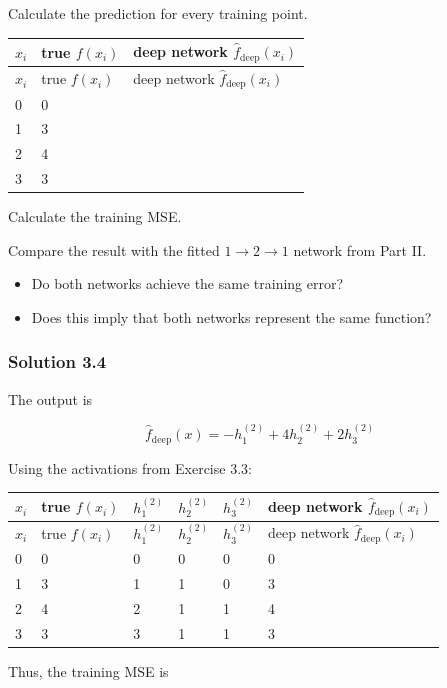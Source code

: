 \documentclass[10pt]{article}
\begin{document}
Calculate the prediction for every training point.

\begingroup
\small
\setlength{\tabcolsep}{4pt}
\begin{longtable}{l|l|l}
$x_i$ & true $f(x_i)$ & deep network $\hat f_{\mathrm{deep}}(x_i)$ \\[1.5pt]
\hline
\endfirsthead
$x_i$ & true $f(x_i)$ & deep network $\hat f_{\mathrm{deep}}(x_i)$ \\[1.5pt]
\hline
\endhead
\rule{0pt}{2.4ex}0 & 0 &  $\phantom{-0.00}$ \\[3pt]
\rule{0pt}{2.4ex}1 & 3 &  $\phantom{-0.00}$ \\[3pt]
\rule{0pt}{2.4ex}2 & 4 &  $\phantom{-0.00}$ \\[3pt]
\rule{0pt}{2.4ex}3 & 3 &  $\phantom{-0.00}$ \\[3pt]
\end{longtable}
\endgroup
Calculate the training MSE.

Compare the result with the fitted $1\rightarrow2\rightarrow1$ network from Part II.

\begin{itemize}
\item
Do both networks achieve the same training error?

\item
Does this imply that both networks represent the same function?

\end{itemize}
\begingroup\color{red}

\subsubsection*{Solution 3.4}
The output is

\[
\hat f_{\mathrm{deep}}(x)=-h^{(2)}_1+4h^{(2)}_2+2h^{(2)}_3
\]

Using the activations from Exercise 3.3:

\begingroup
\small
\setlength{\tabcolsep}{4pt}
\begin{longtable}{l|l|l|l|l|l}
$x_i$ & true $f(x_i)$ & $h^{(2)}_1$ & $h^{(2)}_2$ & $h^{(2)}_3$ & \shortstack[l]{deep network \\ $\hat f_{\mathrm{deep}}(x_i)$} \\[1.5pt]
\hline
\endfirsthead
$x_i$ & true $f(x_i)$ & $h^{(2)}_1$ & $h^{(2)}_2$ & $h^{(2)}_3$ & \shortstack[l]{deep network \\ $\hat f_{\mathrm{deep}}(x_i)$} \\[1.5pt]
\hline
\endhead
0 & 0 & 0 & 0 & 0 & 0 \\[1.5pt]
1 & 3 & 1 & 1 & 0 & 3 \\[1.5pt]
2 & 4 & 2 & 1 & 1 & 4 \\[1.5pt]
3 & 3 & 3 & 1 & 1 & 3 \\[1.5pt]
\end{longtable}
\endgroup
Thus, the training MSE is
\end{document}
